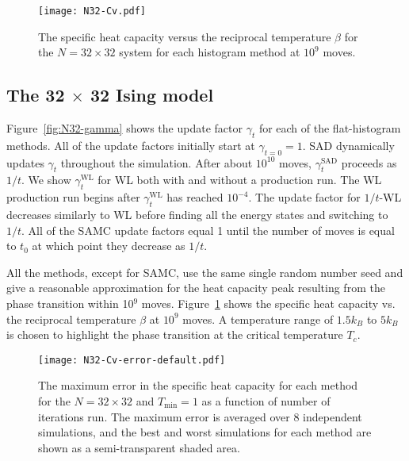 
\begin{figure}
  \texttt{[image: N32-Cv.pdf]}
  \caption{
    The specific heat capacity versus the reciprocal temperature $\beta$ for the $N=32 \times 32$ system for each histogram method at $10^{9}$ moves.}
  \label{fig:N32-cv}
\end{figure}

\subsection{The 32 $\times$ 32 Ising model}
Figure~\ref{fig:N32-gamma} shows the update factor $\gamma_t$ for each
of the flat-histogram methods. All of the update factors initially
start at $\gamma_{t=0} = 1$. SAD dynamically updates $\gamma_t$
throughout the simulation. After about $10^{10}$ moves,
$\gamma^{\text{SAD}}_t$ proceeds as $1/t$. We show
$\gamma^{\text{WL}}_t$ for WL both with and without a production
run. The WL production run begins after $\gamma^{\text{WL}}_t$ has reached
$10^{-4}$. The update factor for $1/t$-WL decreases similarly to WL
before finding all the energy states and switching to $1/t$. All of
the SAMC update factors equal 1 until the number of moves is equal to
$t_0$ at which point they decrease as $1/t$.

All the methods, except for SAMC, use the same single random number seed and
give a reasonable approximation for the heat capacity peak resulting from the
phase transition within 10$^9$ moves. Figure~\ref{fig:N32-cv} shows the
specific heat capacity vs. the reciprocal temperature $\beta$ at $10^{9}$ moves.
A temperature range of $1.5k_B$ to $5k_B$ is chosen to highlight
the phase transition at the critical temperature $T_c$.

\begin{figure}
  \texttt{[image: N32-Cv-error-default.pdf]}
  \caption{The maximum error in the specific heat capacity for each method for the $N=32 \times 32$ and $T_{\min} = 1$ as a function of number of iterations run.  The maximum error is averaged over 8 independent simulations, and the best and worst simulations for each method are shown as a semi-transparent shaded area.}
  \label{fig:N32-cv-error}
\end{figure}


